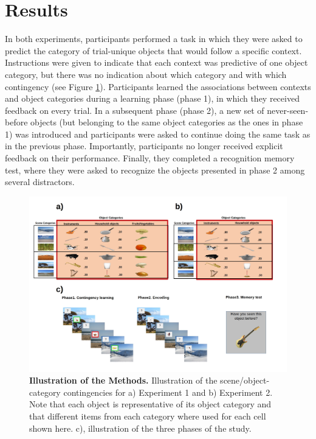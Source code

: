\documentclass[a4paper,12pt]{article}
\begin{document}
\section{Results}
In both experiments, participants performed a task in which they were asked to predict the category of trial-unique objects that would follow a specific context. Instructions were given to indicate that each context was predictive of one object category, but there was no indication about which category and with which contingency (see Figure \ref{fig:Methods}). Participants learned the associations between contexts and object categories during a learning phase (phase 1), in which they received feedback on every trial. In a subsequent phase (phase 2), a new set of never-seen-before objects (but belonging to the same object categories as the ones in phase 1) was introduced and participants were asked to continue doing the same task as in the previous phase. Importantly, participants no longer received explicit feedback on their performance. Finally, they completed a recognition memory test, where they were asked to recognize the objects presented in phase 2 among several distractors.

\begin{figure}[ht!]
\centerline
{\includegraphics[width=1.3\textwidth]{figures/methods.All.jpg}}
\caption{\textbf{Illustration of the Methods.} Illustration of the scene/object-category contingencies  for a) Experiment 1 and b) Experiment 2. Note that each object is representative of its object category and that different items from each category where used for each cell shown here. c), illustration of the three phases of the study. }
\label{fig:Methods}
\end{figure}
\end{document}
